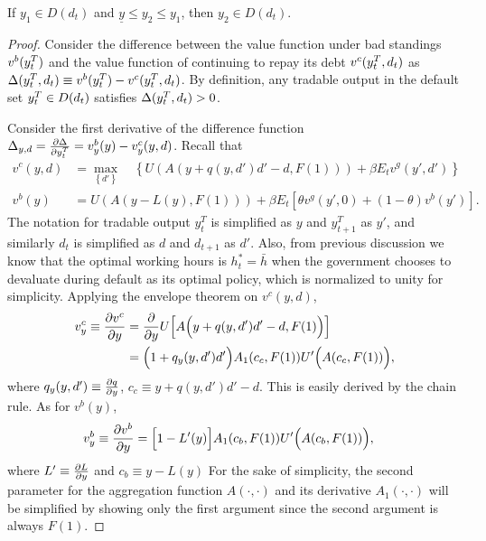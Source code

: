 \begin{proposition}
    \label{prop2}
    If $y_1 \in D(d_t)$ and $\underline{y}\le y_2 \le y_1$, then $y_2 \in D(d_t)$.
\end{proposition}
\begin{proof}
    Consider the difference between the value function under bad standings $v^b(y^T_{t})$ and the value function of continuing to repay its debt  $v^c(y^T_{t}, d_t)$ as $\Delta(y^T_{t}, d_t) \equiv v^b(y^T_{t}) - v^c(y^T_{t}, d_t)$. By definition, any tradable output in the default set $y^T_{t} \in D(d_t)$ satisfies $\Delta(y^T_{t}, d_t) >0$.

    Consider the first derivative of the difference function $\Delta_{y, d} = \pdv{\Delta}{y^T_t} = v^b_{y}(y) - v^c_{y}(y, d)$.
    Recall that
    \begin{align*}
        v^c(y, d) &= \max_{\left\{d' \right\}} \quad
        \left\{
            U\left(
                A\left( y + q(y, d')d' - d, F(1)\right)
             \right)
             + \beta E_t
             v^g \left(
                y', d'
              \right)
         \right\}\\
        v^b(y) &=
            U\left(
                A\left( y - L(y), F(1)\right)
             \right)
             + \beta E_t \left[
                \theta v^g \left(
                    y', 0
                \right)
                + (1-\theta) v^b \left(
                    y'
                 \right)
            \right].
    \end{align*}
    The notation for tradable output $y^T_t$ is simplified as $y$ and $y^T_{t+1}$ as $y'$, and similarly $d_t$ is simplified as $d$ and $d_{t+1}$ as $d'$. Also, from previous discussion we know that the optimal working hours is $h^*_t = \bar{h}$ when the government chooses to devaluate during default as its optimal policy, which is normalized to unity for simplicity. Applying the envelope theorem on $v^c(y, d)$,
    \begin{align*}
        v^c_y \equiv \pdv{v^c}{y} &= \pdv{}{y} U\Big[ A\Big(y + q(y, d')d' - d, F(1)\Big)\Big]\\
        &=\Big(1 + q_y(y, d')d'\Big) A_1(c_c, F(1)) U'\Big(A(c_c, F(1))\Big),
    \end{align*}
    where $q_y(y, d') \equiv \pdv{q}{y}$, $c_c \equiv y + q(y, d')d' -d$. This is easily derived by the chain rule. As for $v^b(y)$,
    \begin{align*}
        v^b_y \equiv \pdv{v^b}{y} &=
        \Big[ 1 - L' (y)\Big] A_1 (c_b, F(1)) U' \Bigl(A(c_b, F(1))\Bigr),
    \end{align*}
    where $L' \equiv \pdv{L}{y}$ and $c_b \equiv y - L(y)$
    For the sake of simplicity, the second parameter for the aggregation function $A(\cdot, \cdot)$ and its derivative $A_1(\cdot,\cdot )$ will be simplified by showing only the first argument since the second argument is always $F(1)$.


\end{proof}

